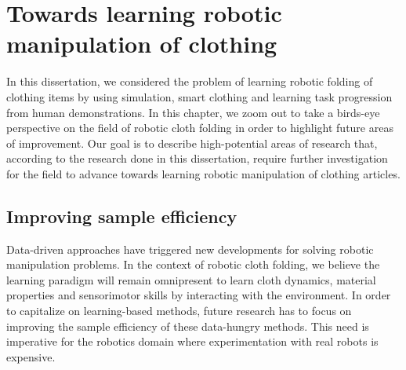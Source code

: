 \documentclass[\home/main.tex]{subfiles}
\begin{document}
\chapter{Towards learning robotic manipulation of clothing} \label{ch:towards_robotic_folding}
In this dissertation, we considered the problem of learning robotic folding of clothing items by using simulation, smart clothing and learning task progression from human demonstrations. In this chapter, we zoom out to take a birds-eye perspective on the field of robotic cloth folding in order to highlight future areas of improvement. Our goal is to describe high-potential areas of research that, according to the research done in this dissertation, require further investigation for the field to advance towards learning robotic manipulation of clothing articles.

\section{Improving sample efficiency}

Data-driven approaches have triggered new developments for solving robotic manipulation problems. In the context of robotic cloth folding, we believe the learning paradigm  will remain omnipresent to learn cloth dynamics, material properties and sensorimotor skills by interacting with the environment. In order to capitalize on learning-based methods, future research has to focus on improving the sample efficiency of these data-hungry methods. This need is imperative for the robotics domain where experimentation with real robots is expensive. 
\end{document}
